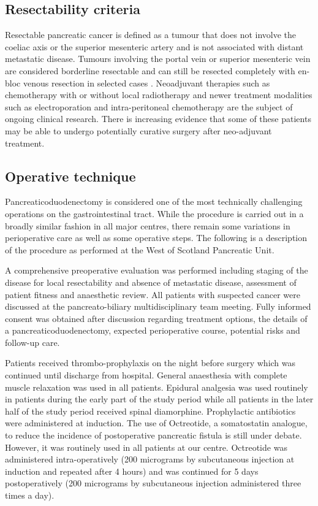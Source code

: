\subsection{Resectability criteria}
\label{sec:resectability_criteria}
Resectable pancreatic cancer is defined as a tumour that does not involve the coeliac axis or the superior mesenteric artery and is not associated with distant metastatic disease. 
Tumours involving the portal vein or superior mesenteric vein are considered borderline resectable and can still be resected completely with en-bloc venous resection in selected cases \parencite{fuhrman_rationale_1996}. 
Neoadjuvant therapies such as chemotherapy with or without local radiotherapy \parencite{gillen_preoperative/neoadjuvant_2010, evans_preoperative_2008} and newer treatment modalities such as electroporation \parencite{bower_irreversible_2011} and intra-peritoneal chemotherapy are the subject of ongoing clinical research.
There is increasing evidence that some of these patients may be able to undergo potentially curative surgery after neo-adjuvant treatment.

\subsection{Operative technique}
Pancreaticoduodenectomy is considered one of the most technically challenging operations on the gastrointestinal tract. 
While the procedure is carried out in a broadly similar fashion in all major centres, there remain some variations in perioperative care as well as some operative steps. 
The following is a description of the procedure as performed at the West of Scotland Pancreatic Unit.

A comprehensive preoperative evaluation was performed including staging of the disease for local resectability and absence of metastatic disease, assessment of patient fitness and anaesthetic review. 
All patients with suspected cancer were discussed at the pancreato-biliary multidisciplinary team meeting. 
Fully informed consent was obtained after discussion regarding treatment options, the details of a pancreaticoduodenectomy, expected perioperative course, potential risks and follow-up care.

Patients received thrombo-prophylaxis on the night before surgery which was continued until discharge from hospital. 
General anaesthesia with complete muscle relaxation was used in all patients. 
Epidural analgesia was used routinely in patients during the early part of the study period while all patients in the later half of the study period received spinal diamorphine. 
Prophylactic antibiotics were administered at induction. 
The use of Octreotide, a somatostatin analogue, to reduce the incidence of postoperative pancreatic fistula is still under debate.
However, it was routinely used in all patients at our centre. 
Octreotide was administered intra-operatively (200 micrograms by subcutaneous injection at induction and repeated after 4 hours) and was continued for 5 days postoperatively (200 micrograms by subcutaneous injection administered three times a day).

